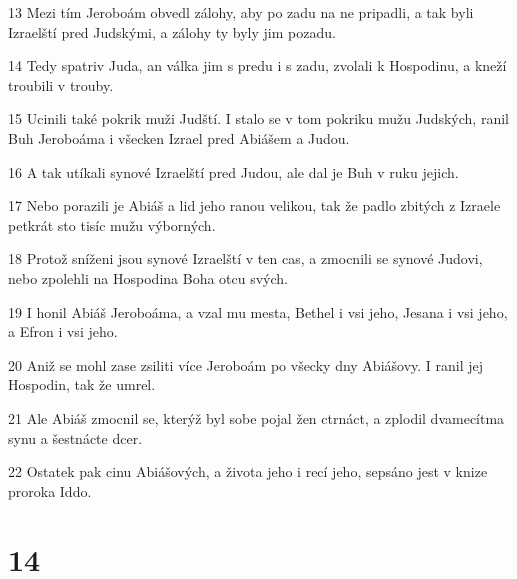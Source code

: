 \par 13 Mezi tím Jeroboám obvedl zálohy, aby po zadu na ne pripadli, a tak byli Izraelští pred Judskými, a zálohy ty byly jim pozadu.
\par 14 Tedy spatriv Juda, an válka jim s predu i s zadu, zvolali k Hospodinu, a kneží troubili v trouby.
\par 15 Ucinili také pokrik muži Judští. I stalo se v tom pokriku mužu Judských, ranil Buh Jeroboáma i všecken Izrael pred Abiášem a Judou.
\par 16 A tak utíkali synové Izraelští pred Judou, ale dal je Buh v ruku jejich.
\par 17 Nebo porazili je Abiáš a lid jeho ranou velikou, tak že padlo zbitých z Izraele petkrát sto tisíc mužu výborných.
\par 18 Protož sníženi jsou synové Izraelští v ten cas, a zmocnili se synové Judovi, nebo zpolehli na Hospodina Boha otcu svých.
\par 19 I honil Abiáš Jeroboáma, a vzal mu mesta, Bethel i vsi jeho, Jesana i vsi jeho, a Efron i vsi jeho.
\par 20 Aniž se mohl zase zsiliti více Jeroboám po všecky dny Abiášovy. I ranil jej Hospodin, tak že umrel.
\par 21 Ale Abiáš zmocnil se, kterýž byl sobe pojal žen ctrnáct, a zplodil dvamecítma synu a šestnácte dcer.
\par 22 Ostatek pak cinu Abiášových, a života jeho i recí jeho, sepsáno jest v knize proroka Iddo.

\chapter{14}

